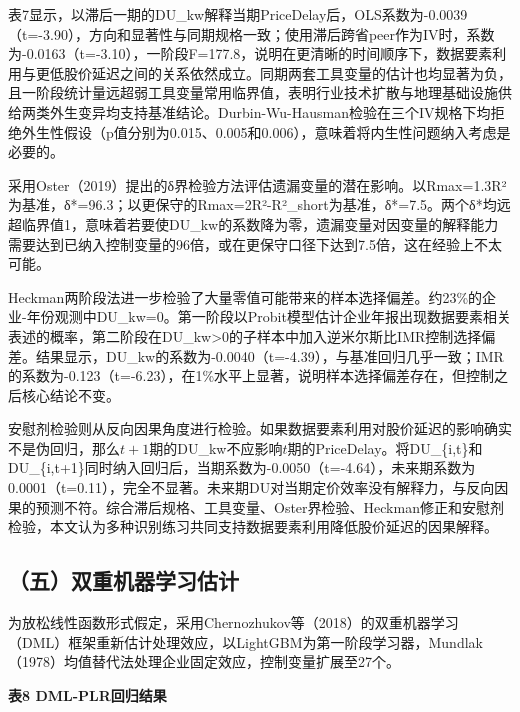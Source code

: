 表7显示，以滞后一期的DU\_kw解释当期PriceDelay后，OLS系数为-0.0039（t=-3.90），方向和显著性与同期规格一致；使用滞后跨省peer作为IV时，系数为-0.0163（t=-3.10），一阶段F=177.8，说明在更清晰的时间顺序下，数据要素利用与更低股价延迟之间的关系依然成立。同期两套工具变量的估计也均显著为负，且一阶段统计量远超弱工具变量常用临界值，表明行业技术扩散与地理基础设施供给两类外生变异均支持基准结论。Durbin-Wu-Hausman检验在三个IV规格下均拒绝外生性假设（p值分别为0.015、0.005和0.006），意味着将内生性问题纳入考虑是必要的。

采用Oster（2019）提出的δ界检验方法评估遗漏变量的潜在影响。以Rmax=1.3R²为基准，δ*=96.3；以更保守的Rmax=2R²-R²\_short为基准，δ*=7.5。两个δ*均远超临界值1，意味着若要使DU\_kw的系数降为零，遗漏变量对因变量的解释能力需要达到已纳入控制变量的96倍，或在更保守口径下达到7.5倍，这在经验上不太可能。

Heckman两阶段法进一步检验了大量零值可能带来的样本选择偏差。约23\%的企业-年份观测中DU\_kw=0。第一阶段以Probit模型估计企业年报出现数据要素相关表述的概率，第二阶段在DU\_kw\textgreater0的子样本中加入逆米尔斯比IMR控制选择偏差。结果显示，DU\_kw的系数为-0.0040（t=-4.39），与基准回归几乎一致；IMR的系数为-0.123（t=-6.23），在1\%水平上显著，说明样本选择偏差存在，但控制之后核心结论不变。

安慰剂检验则从反向因果角度进行检验。如果数据要素利用对股价延迟的影响确实不是伪回归，那么\(t+1\)期的DU\_kw不应影响\(t\)期的PriceDelay。将DU\_\{i,t\}和DU\_\{i,t+1\}同时纳入回归后，当期系数为-0.0050（t=-4.64），未来期系数为0.0001（t=0.11），完全不显著。未来期DU对当期定价效率没有解释力，与反向因果的预测不符。综合滞后规格、工具变量、Oster界检验、Heckman修正和安慰剂检验，本文认为多种识别练习共同支持数据要素利用降低股价延迟的因果解释。

\subsection{（五）双重机器学习估计}\label{ux4e94ux53ccux91cdux673aux5668ux5b66ux4e60ux4f30ux8ba1}

为放松线性函数形式假定，采用Chernozhukov等（2018）的双重机器学习（DML）框架重新估计处理效应，以LightGBM为第一阶段学习器，Mundlak（1978）均值替代法处理企业固定效应，控制变量扩展至27个。

\textbf{表8 DML-PLR回归结果}

